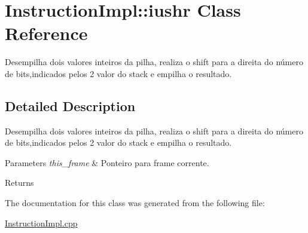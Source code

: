 \hypertarget{class_instruction_impl_1_1iushr}{}\section{Instruction\+Impl\+:\+:iushr Class Reference}
\label{class_instruction_impl_1_1iushr}


Desempilha dois valores inteiros da pilha, realiza o shift para a direita do número de bits,indicados pelos 2 valor do stack e empilha o resultado.  




\subsection{Detailed Description}
Desempilha dois valores inteiros da pilha, realiza o shift para a direita do número de bits,indicados pelos 2 valor do stack e empilha o resultado. 


\begin{DoxyParams}{Parameters}
{\em this\+\_\+frame} & Ponteiro para frame corrente. \\
\hline
\end{DoxyParams}
\begin{DoxyReturn}{Returns}

\end{DoxyReturn}


The documentation for this class was generated from the following file\+:\begin{DoxyCompactItemize}
\item 
\hyperlink{_instruction_impl_8cpp}{Instruction\+Impl.\+cpp}\end{DoxyCompactItemize}
